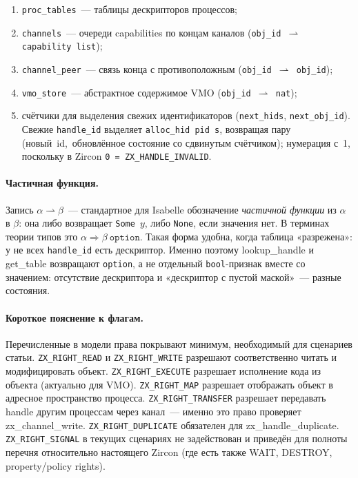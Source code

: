 \documentclass[11pt,a4paper]{article}
\newcommand{\isabel}[1]{{\isabelleit #1}}
\newcommand{\lemmaname}[1]{\isabel{#1}}
\begin{document}
\begin{enumerate}[leftmargin=1.6em,label=\arabic*.,ref=\arabic*]
\begin{enumerate}[leftmargin=1.4em,label=\alph*)]
		      \item \texttt{proc\_tables}~--- таблицы дескрипторов процессов;
		      \item \texttt{channels}~--- очереди capabilities по концам
		            каналов (\texttt{obj\_id $\rightharpoonup$ capability list});
		      \item \texttt{channel\_peer}~--- связь конца с противоположным
		            (\texttt{obj\_id $\rightharpoonup$ obj\_id});
		      \item \texttt{vmo\_store}~--- абстрактное содержимое VMO
		            (\texttt{obj\_id $\rightharpoonup$ nat});
		      \item счётчики для выделения свежих идентификаторов
		            (\texttt{next\_hids}, \texttt{next\_obj\_id}).
		            Свежие \texttt{handle\_id} выделяет
		            \texttt{alloc\_hid~pid~s}, возвращая пару
		            (новый~id,~обновлённое состояние со сдвинутым счётчиком);
		            нумерация с~1, поскольку в Zircon
		            \texttt{0 = ZX\_HANDLE\_INVALID}.
	      \end{enumerate}
\end{enumerate}
\paragraph{Частичная функция.}
Запись $\alpha \rightharpoonup \beta$~--- стандартное для Isabelle
обозначение \emph{частичной функции} из $\alpha$ в $\beta$: она либо
возвращает \texttt{Some}~$y$, либо \texttt{None}, если значения нет.
В терминах теории типов это $\alpha \Rightarrow \beta~\texttt{option}$.
Такая форма удобна, когда таблица «разрежена»: у не всех
\texttt{handle\_id} есть дескриптор. Именно поэтому
\lemmaname{lookup\_handle} и \lemmaname{get\_table} возвращают
\texttt{option}, а не отдельный \texttt{bool}-признак вместе со
значением: отсутствие дескриптора и «дескриптор с пустой маской»~---
разные состояния.

\paragraph{Короткое пояснение к флагам.}
Перечисленные в модели права покрывают минимум, необходимый для сценариев
статьи. \texttt{ZX\_RIGHT\_READ} и \texttt{ZX\_RIGHT\_WRITE} разрешают
соответственно читать и модифицировать объект.
\texttt{ZX\_RIGHT\_EXECUTE} разрешает исполнение кода из объекта
(актуально для VMO). \texttt{ZX\_RIGHT\_MAP} разрешает отображать
объект в адресное пространство процесса.
\texttt{ZX\_RIGHT\_TRANSFER} разрешает передавать handle другим
процессам через канал~--- именно это право проверяет
\lemmaname{zx\_channel\_write}. \texttt{ZX\_RIGHT\_DUPLICATE}
обязателен для \lemmaname{zx\_handle\_duplicate}.
\texttt{ZX\_RIGHT\_SIGNAL} в текущих сценариях не задействован и
приведён для полноты перечня относительно настоящего Zircon
(где есть также WAIT, DESTROY, property/policy rights).
\end{document}
